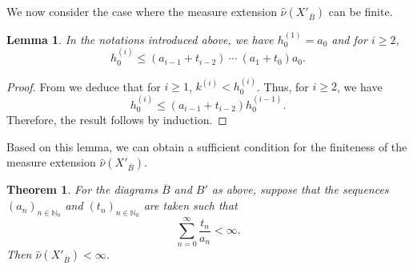 \documentclass[11pt,reqno]{amsart}
\theoremstyle{definition}
\theoremstyle{remark}
\theoremstyle{plain}
\newtheorem{thm}[definition]{Theorem}
\newtheorem{lemma}[definition]{Lemma}
\def\ol{\overline}
\def\wh{\widehat}
\newcommand{\N}{\mathbb N}
\newcommand{\be}{\begin{equation}}
\newcommand{\ee}{\end{equation}}
\numberwithin{equation}{section}
\begin{document}
We now consider the case where the measure extension $\wh\nu(X'_{\ol B})$
can be finite. 

\begin{lemma}
In the notations introduced above, we have $h_0^{(1)} = a_0$ and  for $i \geq 2$,
\be\label{eq s5 h_0 from above}
h_0^{(i)} \leq  (a_{i-1} + t_{i-2}) \ \cdots\ (a_1 + t_0)
a_0.
\ee
\end{lemma}

\begin{proof} 
From  we deduce that for $i\geq 1$, 
$k^{(i)} < h_0^{(i)}$. Thus, for $i \geq 2$, we have
$$
h_0^{(i)} \leq (a_{i-1} + t_{i-2} )h_0^{(i-1)}.
$$ 
Therefore, the result follows by induction. 
\end{proof}

Based on this lemma, we can obtain a sufficient condition for the finiteness of the measure extension $\wh\nu(X'_{\ol B})$. 

\begin{thm} \label{thm s5-2}
For the diagrams $\ol B$ and $B'$ as above, suppose that the sequences $(a_n)_{n \in \N_0}$ and $(t_n)_{n \in \N_0}$ are taken such that 
$$
\sum_{n = 0}^{\infty} \frac{t_n}{a_n} < \infty.
$$
Then $\wh\nu(X'_{\ol B}) < \infty$. 
\end{thm}
\end{document}
